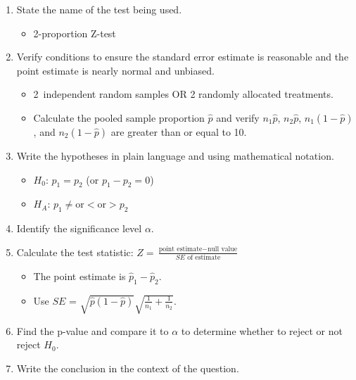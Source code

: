\begin{termBox}{
\begin{enumerate}
\setlength{\itemsep}{0mm}
\item State the name of the test being used.
\vspace{-1.5mm}
\begin{itemize}
\item 2-proportion Z-test
\end{itemize}
\item Verify conditions to ensure the standard error estimate is reasonable and the point estimate is nearly normal and unbiased.\vspace{-1.5mm}
  \begin{itemize}
  \setlength{\itemsep}{0mm}
  \item 2~independent random samples OR 2 randomly allocated treatments. 
  \item Calculate the pooled sample proportion $\hat{p}$ and verify $n_1\hat{p}$, $n_2\hat{p}$, $n_1(1 - \hat{p})$, and $n_2(1 - \hat{p})$ are greater than or equal to 10.
  \end{itemize}
\item Write the hypotheses in plain language and using mathematical notation.\vspace{-1.5mm}
  \begin{itemize}
  \setlength{\itemsep}{0mm}
  \item $H_0$: $p_1 = p_2$ (or $p_1 - p_2 = 0$)
  \item $H_A$: $p_1 \ne \text{or} < \text{or} > p_2$
  \end{itemize}
\item Identify the significance level $\alpha$.
\item Calculate the test statistic: $Z = \frac{\text{point estimate} - \text{null value}}{SE \text{ of estimate}}$
  \begin{itemize}
  \item The point estimate is $\hat{p}_1 - \hat{p}_2$.
  \item Use $SE$ = $\sqrt{\hat{p}(1-\hat{p})}\sqrt{\frac{1}{n_1} + \frac{1}{n_2}}$.
  \end{itemize}
\item Find the p-value and compare it to $\alpha$ to determine whether to reject or not reject $H_0$.
\item Write the conclusion in the context of the question.
\end{enumerate}}
\end{termBox}


